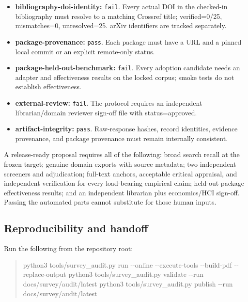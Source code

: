 \documentclass[11pt]{article}
\newenvironment{Shaded}{\begin{quote}\small}{\end{quote}}
\newcommand{\NormalTok}[1]{#1}
\newcommand{\ExtensionTok}[1]{#1}
\begin{document}
\begin{itemize}
\item
  \textbf{bibliography-doi-identity:} \texttt{fail}. Every actual DOI in the checked-in bibliography must resolve to a matching Crossref title; verified=0/25, mismatches=0, unresolved=25. arXiv identifiers are tracked separately.
\item
  \textbf{package-provenance:} \texttt{pass}. Each package must have a URL and a pinned local commit or an explicit remote-only status.
\item
  \textbf{package-held-out-benchmark:} \texttt{fail}. Every adoption candidate needs an adapter and effectiveness results on the locked corpus; smoke tests do not establish effectiveness.
\item
  \textbf{external-review:} \texttt{fail}. The protocol requires an independent librarian/domain reviewer sign-off file with status=approved.
\item
  \textbf{artifact-integrity:} \texttt{pass}. Raw-response hashes, record identities, evidence provenance, and package provenance must remain internally consistent.
\end{itemize}

A release-ready proposal requires all of the following: broad search recall at the frozen target; genuine domain exports with source metadata; two independent screeners and adjudication; full-text anchors, acceptable critical appraisal, and independent verification for every load-bearing empirical claim; held-out package effectiveness results; and an independent librarian plus economics/HCI sign-off. Passing the automated parts cannot substitute for those human inputs.

\hypertarget{reproducibility-and-handoff}{%
\subsection{Reproducibility and handoff}\label{reproducibility-and-handoff}}

Run the following from the repository root:

\begin{Shaded}
\begin{Highlighting}[]
\ExtensionTok{python3}\NormalTok{ tools/survey\_audit.py run {-}{-}online {-}{-}execute{-}tools {-}{-}build{-}pdf {-}{-}replace{-}output}
\ExtensionTok{python3}\NormalTok{ tools/survey\_audit.py validate {-}{-}run docs/survey/audit/latest}
\ExtensionTok{python3}\NormalTok{ tools/survey\_audit.py publish {-}{-}run docs/survey/audit/latest}
\end{Highlighting}
\end{Shaded}
\end{document}
